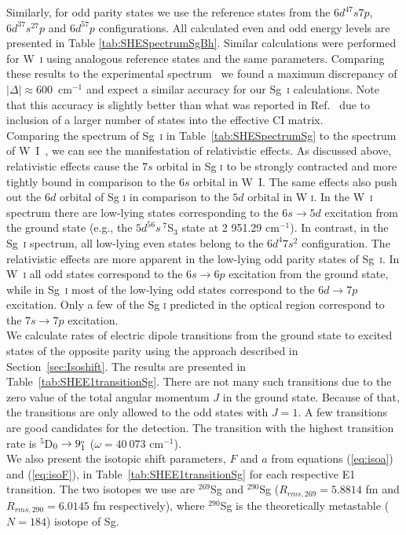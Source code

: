 \documentclass[10pt,a4paper, twoside, openright]{report}
\begin{document}
Similarly, for odd parity states we use the reference states from the $6d^47s7p$, $6d^37s^27p$ and $6d^57p$ configurations.  All calculated even and odd energy levels are presented in Table \ref{tab:SHESpectrumSgBh}. Similar calculations were performed for W~\textsc{i}  using analogous reference states and the same parameters. Comparing these results to the experimental spectrum~\cite{NIST_ASD} we found a maximum discrepancy of $|\Delta| \approx 600 $~cm$^{-1}$ and expect a similar accuracy for our Sg~\textsc{i} calculations. Note that this accuracy is slightly better than what was reported in Ref.~\cite{DBHF2017} due to inclusion of a larger number of states into the effective CI matrix.\\
\linebreak
Comparing the spectrum of Sg~\textsc{i} in Table~\ref{tab:SHESpectrumSg} to the spectrum of W~\textsc{I}~\cite{NIST_ASD}, we can see the manifestation of relativistic effects. As discussed above, relativistic effects cause the $7s$ orbital in Sg \textsc{i} to be strongly contracted and more tightly bound in comparison to the $6s$ orbital in W~\textsc{I}. The same effects also push out the $6d$ orbital of Sg \textsc{i} in comparison to the $5d$ orbital in W \textsc{i}. In the  W~\textsc{i} spectrum there are low-lying states corresponding to the $6s \rightarrow 5d$ excitation from the ground state (e.g., the $5d^56s \ ^7$S$_3$ state at 2 951.29 cm$^{-1}$). In contrast, in the Sg~\textsc{i} spectrum, all low-lying even states belong to the  $6d^4 7s^2$ configuration. The relativistic effects are more apparent in the low-lying odd parity states of Sg~\textsc{i}. In W~\textsc{i} all odd states correspond to the $6s \rightarrow 6p$ excitation from the ground state, while in Sg~\textsc{i} most of the low-lying odd states correspond to the $6d \rightarrow 7p$ excitation. Only a few of the Sg \textsc{i} predicted in the optical region correspond to the $7s \rightarrow 7p$ excitation.  \\
\linebreak
We calculate rates of electric dipole transitions from the ground state to excited states of the opposite parity using the approach described in Section~\ref{sec:Isoshift}. The results are presented in Table~\ref{tab:SHEE1transitionSg}. There are not many such transitions due to the zero value of the total angular momentum $J$ in the ground state. Because of that, the transitions are only allowed to the odd states with $J=1$. A few transitions are good candidates for the detection. The transition with the highest transition rate is $^5$D$_0 \rightarrow 9_1^{\rm_o}$ ($\omega = 40 \ 073 \text{ cm}^{-1}$).\\
\linebreak
We also present the isotopic shift parameters, $F$ and $a$ from equations (\ref{eq:isoa}) and (\ref{eq:isoF}), in Table~\ref{tab:SHEE1transitionSg} for each respective E1 transition. The two isotopes we use are $^{269}$Sg  and $^{290}$Sg ($R_{rms,\text{269}} = 5.8814$ fm and $R_{rms,\text{290}}  = 6.0145$ fm respectively),  where $^{290}$Sg is the theoretically  metastable ($N=184$) isotope of Sg. 
\end{document}
